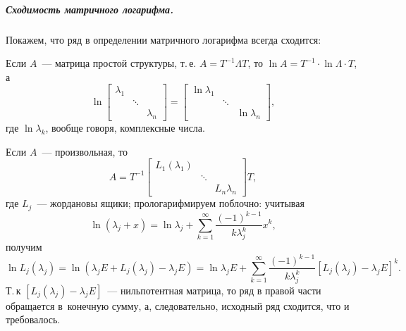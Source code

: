 \subparagraph*{Сходимость матричного логарифма.}
Покажем, что ряд в определении матричного логарифма всегда сходится:

Если $A$~--- матрица простой структуры,
т.\,е. $A = T^{-1}\Lambda T$, то $\ln A = T^{-1} \cdot \ln\Lambda \cdot T$, а 
\begin{equation*}
	\ln \left[
	\begin{array}{rcl}
		\lambda_1	& 		& 		\\
 					&\ddots & 		\\
  					& 		& \lambda_n
	\end{array}
	\right] = \left[
	\begin{array}{rcl}
	\ln\lambda_1	& 		& 		\\
					&\ddots	& 		\\
  					& 		& \ln\lambda_n
	\end{array}
	\right],
\end{equation*}
где $\ln\lambda_k$, вообще говоря, комплексные числа.

Если $A$~--- произвольная, то 
\begin{equation*}
	A = T^{-1} \left[
	\begin{array}{rcl}
		L_1(\lambda_1)	&		& 		\\
						&\ddots & 		\\
	  					& 		& L_n\lambda_n
	\end{array}
	\right] T,
\end{equation*}
где $L_j$~--- жордановы ящики; прологарифмируем поблочно: учитывая 
\begin{equation*}
	\ln (\lambda_j + x) = 
	\ln\lambda_j + \sum_{k=1}^\infty {\dfrac{(-1)^{k-1}}{k\lambda_j^k} x^k},
\end{equation*} 
получим 
\begin{equation*}
	\ln L_j(\lambda_j) = 
	\ln \left( \lambda_j E + L_j(\lambda_j) - \lambda_j E \right) = 
	\ln\lambda_j E +
	  \sum_{k=1}^\infty{\dfrac{(-1)^{k-1}}{k\lambda_j^k}
	  \left[L_j(\lambda_j) - \lambda_j E \right]^k}.
\end{equation*}
Т.\,к $\left[L_j(\lambda_j) - \lambda_j E \right]$~--- нильпотентная матрица,
то ряд в правой части обращается в~конечную сумму,
а, следовательно, исходный ряд сходится, что и требовалось.

